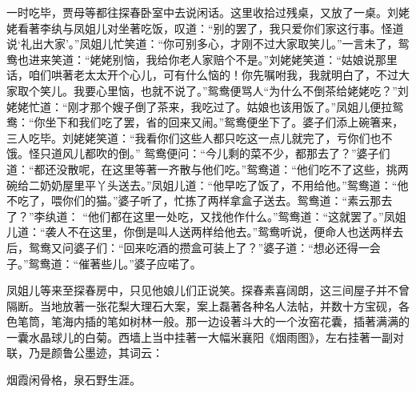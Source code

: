 \begin{parag}
    一时吃毕，贾母等都往探春卧室中去说闲话。这里收拾过残桌，又放了一桌。刘姥姥看著李纨与凤姐儿对坐著吃饭，叹道：“别的罢了，我只爱你们家这行事。怪道说‘礼出大家’。”凤姐儿忙笑道：“你可别多心，才刚不过大家取笑儿。”一言未了，鸳鸯也进来笑道：“姥姥别恼，我给你老人家赔个不是。”刘姥姥笑道：“姑娘说那里话，咱们哄著老太太开个心儿，可有什么恼的！你先嘱咐我，我就明白了，不过大家取个笑儿。我要心里恼，也就不说了。”鸳鸯便骂人“为什么不倒茶给姥姥吃？”刘姥姥忙道：“刚才那个嫂子倒了茶来，我吃过了。姑娘也该用饭了。”凤姐儿便拉鸳鸯：“你坐下和我们吃了罢，省的回来又闹。”鸳鸯便坐下了。婆子们添上碗箸来，三人吃毕。刘姥姥笑道：“我看你们这些人都只吃这一点儿就完了，亏你们也不饿。怪只道风儿都吹的倒。” 鸳鸯便问：“今儿剩的菜不少，都那去了？”婆子们道：“都还没散呢，在这里等著一齐散与他们吃。”鸳鸯道：“他们吃不了这些，挑两碗给二奶奶屋里平丫头送去。”凤姐儿道：“他早吃了饭了，不用给他。”鸳鸯道：“他不吃了，喂你们的猫。”婆子听了，忙拣了两样拿盒子送去。鸳鸯道：“素云那去了？”李纨道： “他们都在这里一处吃，又找他作什么。”鸳鸯道：“这就罢了。”凤姐儿道：“袭人不在这里，你倒是叫人送两样给他去。”鸳鸯听说，便命人也送两样去后，鸳鸯又问婆子们：“回来吃酒的攒盒可装上了？”婆子道：“想必还得一会子。”鸳鸯道：“催著些儿。”婆子应喏了。
\end{parag}


\begin{parag}
    凤姐儿等来至探春房中，只见他娘儿们正说笑。探春素喜阔朗，这三间屋子并不曾隔断。当地放著一张花梨大理石大案，案上磊著各种名人法帖，并数十方宝砚，各色笔筒，笔海内插的笔如树林一般。那一边设著斗大的一个汝窑花囊，插著满满的一囊水晶球儿的白菊。西墙上当中挂著一大幅米襄阳《烟雨图》，左右挂著一副对联，乃是颜鲁公墨迹，其词云：
\end{parag}


\begin{poem}
    \begin{pl}
        烟霞闲骨格，泉石野生涯。\end{pl}
\end{poem}


